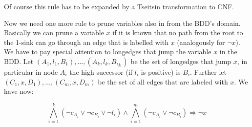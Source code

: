 \documentclass{article}
\begin{document}
Of course this rule has to be expanded by a Tseitsin transformation to CNF. 

Now we need one more rule to prune variables also in from the BDD's domain. 
Basically we can prune a variable $x$ if it is known that no path from the root 
to the 1-sink can go through an edge that is labelled with $x$ (analogously for 
$\neg x$). We have to pay special attention to longedges that jump the variable 
$x$ in the BDD. Let $(A_1, l_1, B_1),\ldots,(A_k, l_k, B,_k)$ be the set of 
longedges that jump $x$, in particular in node $A_i$ the high-successor (if 
$l_i$ is positive) is $B_i$. Further let $(C_1, x, D_1),\ldots, (C_m, x, D_m)$ 
be the set of all edges that are labeled with $x$. We have now: 

\begin{equation}
\bigwedge_{i=1}^k{(\neg c_{A_i}\vee\neg c_{B_i}\vee\neg l_i)}\wedge\bigwedge_{i=1}^m{(\neg c_{A_i}\vee\neg c_{B_i})}\Rightarrow \neg x
\end{equation}
\end{document}
